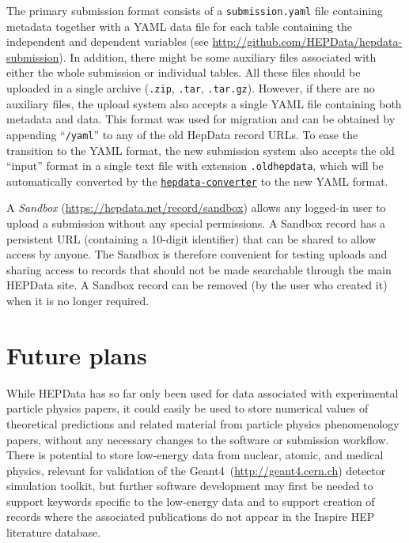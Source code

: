 \documentclass[a4paper]{jpconf}
\begin{document}
The primary submission format consists of a \texttt{submission.yaml} file
containing metadata together with a YAML data file for each table containing
the independent and dependent variables (see
\url{http://github.com/HEPData/hepdata-submission}).  In addition, there might
be some auxiliary files associated with either the whole submission or
individual tables.  All these files should be uploaded in a single archive
(\texttt{.zip}, \texttt{.tar}, \texttt{.tar.gz}).  However, if there are no
auxiliary files, the upload system also accepts a single YAML file containing
both metadata and data.  This format was used for migration and can be obtained
by appending ``\texttt{/yaml}'' to any of the old HepData record URLs.  To ease
the transition to the YAML format, the new submission system also accepts the
old ``input'' format in a single text file with extension \texttt{.oldhepdata},
which will be automatically converted by the
\href{https://github.com/HEPData/hepdata-converter}{\texttt{hepdata-converter}}
to the new YAML format.

A \emph{Sandbox} (\url{https://hepdata.net/record/sandbox}) allows any
logged-in user to upload a submission without any special permissions.  A
Sandbox record has a persistent URL (containing a 10-digit identifier) that can
be shared to allow access by anyone.  The Sandbox is therefore convenient for
testing uploads and sharing access to records that should not be made
searchable through the main HEPData site.  A Sandbox record can be removed (by
the user who created it) when it is no longer required.

\section{Future plans}

While HEPData has so far only been used for data associated with experimental
particle physics papers, it could easily be used to store numerical values of
theoretical predictions and related material from particle physics
phenomenology papers, without any necessary changes to the software or
submission workflow.  There is potential to store low-energy data from nuclear,
atomic, and medical physics, relevant for validation of the
Geant4~(\url{http://geant4.cern.ch}) detector simulation toolkit, but further
software development may first be needed to support keywords specific to the
low-energy data and to support creation of records where the associated
publications do not appear in the Inspire HEP literature database.
\end{document}
